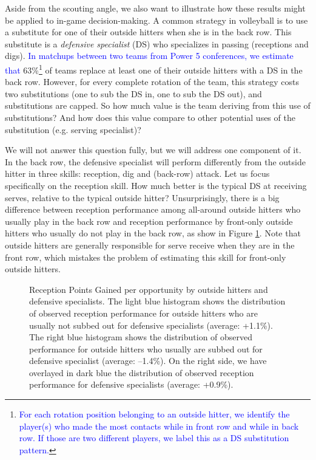 \documentclass[USenglish]{article}
\theoremstyle{dgthm}
\theoremstyle{dgdef}
\begin{document}
Aside from the scouting angle, we also want to illustrate how these results might be applied to in-game decision-making. A common strategy in volleyball is to use a substitute for one of their outside hitters when she is in the back row. This substitute is a {\it defensive specialist} (DS) who specializes in passing (receptions and digs). \textcolor{blue}{In matchups between two teams from Power 5 conferences, we estimate that} 63\%\footnote{\textcolor{blue}{For each rotation position belonging to an outside hitter, we identify the player(s) who made the most contacts while in front row and while in back row. If those are two different players, we label this as a DS substitution pattern.}} of teams replace at least one of their outside hitters with a DS in the back row. However, for every complete rotation of the team, this strategy costs two substitutions (one to sub the DS in, one to sub the DS out), and substitutions are capped. So how much value is the team deriving from this use of substitutions? And how does this value compare to other potential uses of the substitution (e.g. serving specialist)?

We will not answer this question fully, but we will address one component of it. In the back row, the defensive specialist will perform differently from the outside hitter in three skills: reception, dig and (back-row) attack. Let us focus specifically on the reception skill. How much better is the typical DS at receiving serves, relative to the typical outside hitter? Unsurprisingly, there is a big difference between reception performance among all-around outside hitters who usually play in the back row and reception performance by front-only outside hitters who usually do not play in the back row, as show in Figure \ref{fig:oh-comparison}. Note that outside hitters are generally responsible for serve receive when they are in the front row, which mistakes the problem of estimating this skill for front-only outside hitters.

\begin{figure}
    \centering
    \caption{Reception Points Gained per opportunity by outside hitters and defensive specialists. The light blue histogram shows the distribution of observed reception performance for outside hitters who are usually not subbed out for defensive specialists (average: +1.1\%). The right blue histogram shows the distribution of observed performance for outside hitters who usually are subbed out for defensive specialist (average: --1.4\%). On the right side, we have overlayed in dark blue the distribution of observed reception performance for defensive specialists (average: +0.9\%).}
    \label{fig:oh-comparison}
\end{figure}
\end{document}
